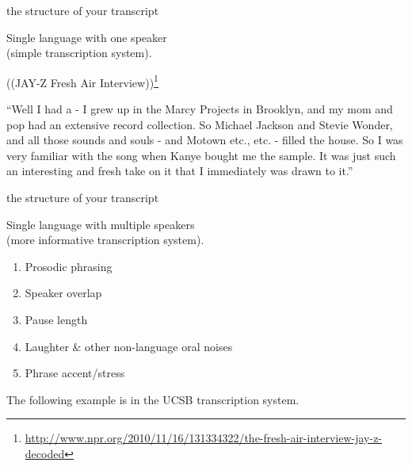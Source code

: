 \documentclass{beamer}
\begin{document}
    \begin{frame}{the structure of your transcript}
      \begin{description}
        \item<1->[Example 1:] Single language with one speaker\\(simple transcription system).
        \item<1->[]
        \item<2->[] ((JAY-Z Fresh Air Interview))\footnote{\tiny\url{http://www.npr.org/2010/11/16/131334322/the-fresh-air-interview-jay-z-decoded}}
        \item<2->[\href{run:audio/Jay-Z.wav}{JAY-Z:}] ``Well I had a - I grew up in the Marcy Projects in Brooklyn, and my mom and pop had an extensive record collection. So Michael Jackson and Stevie Wonder, and all those sounds and souls - and Motown etc., etc. - filled the house. So I was very familiar with the song when Kanye bought me the sample. It was just such an interesting and fresh take on it that I immediately was drawn to it.''
      \end{description}
    \end{frame}
    
    \begin{frame}{the structure of your transcript}
      \begin{description}
      \item<1->[Example 2:] Single language with multiple speakers\\(more informative transcription system).
        \begin{enumerate}
          \item<2-> Prosodic phrasing
          \item<2-> Speaker overlap
          \item<2-> Pause length
          \item<2-> Laughter \& other non-language oral noises
          \item<2-> Phrase accent/stress
        \end{enumerate}
      \item<3->[Note:] The following example is in the UCSB transcription system.
      \end{description}
    \end{frame}
    
\end{document}
